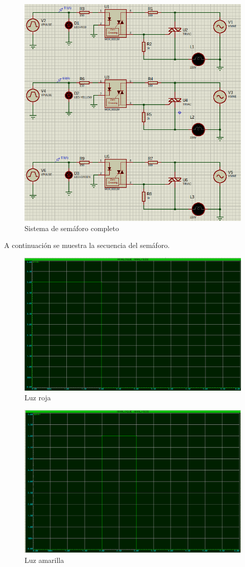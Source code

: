 \documentclass{article}
\begin{document}
\begin{enumerate}[label=\alph*.]
\begin{figure}[h!]
    \centering
    \includegraphics[width=0.6\linewidth]{img/Semaforo completo.png}
    \caption{Sistema de semáforo completo}
    \label{fig:esquematico}
\end{figure}

A continuación se muestra la secuencia del semáforo.

\begin{figure}[h!]
    \centering
    \includegraphics[width=0.6\linewidth]{img/Señal rojo.png}
    \caption{Luz roja}
    \label{fig:esquematico}
\end{figure}


\begin{figure}[h!]
    \centering
    \includegraphics[width=0.6\linewidth]{img/Señal amarillo.png}
    \caption{Luz amarilla}
    \label{fig:esquematico}
\end{figure}


\end{enumerate}
\end{document}
